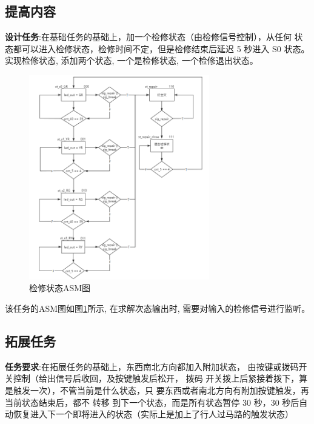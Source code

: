 \documentclass{article}
\begin{document}
\subsection*{提高内容}
\textbf{设计任务}:在基础任务的基础上，加一个检修状态（由检修信号控制），从任何 状态都可以进入检修状态，检修时间不定，但是检修结束后延迟 5 秒进入 S0 状态。\\
实现检修状态, 添加两个状态, 一个是检修状态, 一个检修退出状态。
\begin{figure}[htbp]
    \centering
    \includegraphics[width=0.7\textwidth]{image/2024-06-19-14-38-12.png}
    \caption{检修状态ASM图}
    \label{image_asm_2}
\end{figure}
该任务的ASM图如图\ref{image_asm_2}所示, 在求解次态输出时, 需要对输入的检修信号进行监听。
\subsection*{拓展任务}
\textbf{任务要求}:在拓展任务的基础上，东西南北方向都加入附加状态， 由按键或拨码开关控制（给出信号后收回，及按键触发后松开，
拨码 开关拨上后紧接着拨下，算是触发一次），不管当前是什么状态，只 要东西或者南北方向有附加按键触发，再当前状态结束后，都不
转移 到下一个状态，而是所有状态暂停 30 秒，30 秒后自动恢复进入下一个即将进入的状态（实际上是加上了行人过马路的触发状态）\\
\end{document}
